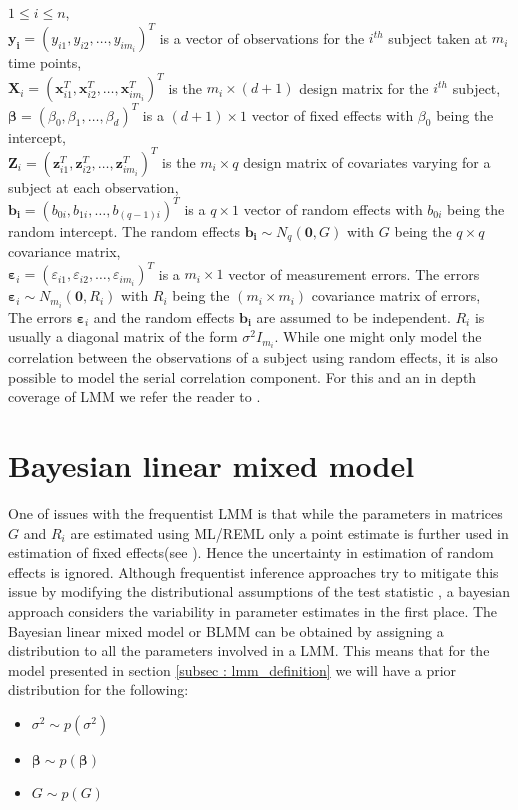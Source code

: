 $1 \le i \le n$,\\
$\boldsymbol{y_i} = {(y_{i1}, y_{i2}, \ldots, y_{im_i})}^T$ is a vector of observations for the $i^{th}$ subject taken at $m_i$ time points,\\
$\boldsymbol{X}_{i} = {(\boldsymbol{x}_{i1}^T, \boldsymbol{x}_{i2}^T, \ldots, \boldsymbol{x}_{im_i}^T)}^T$ is the $m_i \times (d+1)$ design matrix for the $i^{th}$ subject,\\
$\boldsymbol{\beta} = {(\beta_0, \beta_1, \ldots, \beta_d)}^T$ is a $(d+1) \times 1$ vector of fixed effects with $\beta_0$ being the intercept,\\
$\boldsymbol{Z}_{i} = {(\boldsymbol{z}_{i1}^T, \boldsymbol{z}_{i2}^T, \ldots, \boldsymbol{z}_{im_i}^T)}^T$ is the $m_i \times q$ design matrix of covariates varying for a subject at each observation,\\
$\boldsymbol{b_i} = {(b_{0i}, b_{1i}, \ldots, b_{(q-1)i})}^T$ is a $q \times 1$ vector of random effects with $b_{0i}$ being the random intercept. The random effects $\boldsymbol{b_i} \sim N_q(\boldsymbol{0}, G)$ with $G$ being the $q \times q$ covariance matrix,\\ 
$\boldsymbol{\varepsilon}_{i} = {(\varepsilon_{i1}, \varepsilon_{i2}, \ldots, \varepsilon_{im_i})}^T$ is a $m_i \times 1$ vector of measurement errors. The errors $\boldsymbol{\varepsilon}_{i} \sim N_{m_i}(\boldsymbol{0}, R_i)$ with $R_i$ being the $(m_i \times m_i)$ covariance matrix of errors,\\

The errors $\boldsymbol{\varepsilon}_{i}$ and the random effects $\boldsymbol{b_i}$ are assumed to be independent. $R_i$ is usually a diagonal matrix of the form $\sigma^2I_{m_i}$. While one might only model the correlation between the observations of a subject using random effects, it is also possible to model the serial correlation component. For this and an in depth coverage of LMM we refer the reader to \citet{verbeke_linear_2009}.\\

\section{Bayesian linear mixed model}
\label{sec : blmm}
One of issues with the frequentist LMM is that while the parameters in matrices $G$ and $R_i$ are estimated using ML/REML only a point estimate is further used in estimation of fixed effects(see \cite[chap. 5]{verbeke_linear_2009}). Hence the uncertainty in estimation of random effects is ignored. Although frequentist inference approaches try to mitigate this issue by modifying the distributional assumptions of the test statistic \citep[pg. 56]{verbeke_linear_2009}, a bayesian approach considers the variability in parameter estimates in the first place. The Bayesian linear mixed model or BLMM can be obtained by assigning a distribution to all the parameters involved in a LMM. This means that for the model presented in section \ref{subsec : lmm_definition} we will have a prior distribution for the following:\\

\begin{itemize}
\item $\sigma^2 \sim p(\sigma^2)$
\item $\boldsymbol{\beta} \sim p(\boldsymbol{\beta})$
\item $G \sim p(G)$
\end{itemize}